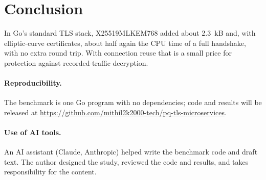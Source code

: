 \documentclass[11pt]{article}
\begin{document}
\section{Conclusion}
In Go's standard TLS stack, X25519MLKEM768 added about 2.3~kB and, with elliptic-curve certificates, about half again the CPU time of a
full handshake, with no extra round trip. With connection reuse that is a small price for protection against recorded-traffic
decryption.

\paragraph{Reproducibility.} The benchmark is one Go program with no dependencies; code and results will be released at
\newline\url{https://github.com/mithil2k2000-tech/pq-tls-microservices}.

\paragraph{Use of AI tools.} An AI assistant (Claude, Anthropic) helped write the benchmark code and draft text. The author designed the
study, reviewed the code and results, and takes responsibility for the content.



\end{document}
